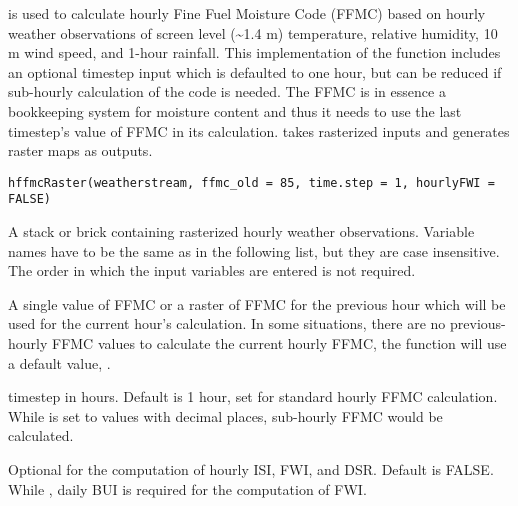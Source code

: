 \documentclass[a4paper]{book}
\begin{document}
%
\begin{Description}\relax
{} is used to calculate hourly Fine Fuel Moisture Code
(FFMC) based on hourly weather observations of screen level (\textasciitilde{}1.4 m)
temperature, relative humidity, 10 m wind speed, and 1-hour rainfall. This
implementation of the function includes an optional timestep input which is
defaulted to one hour, but can be reduced if sub-hourly calculation of the
code is needed.  The FFMC is in essence a bookkeeping system for moisture
content and thus it needs to use the last timestep's value of FFMC in its
calculation.  takes rasterized inputs and generates raster
maps as outputs.
\end{Description}
%
\begin{Usage}
\begin{verbatim}
hffmcRaster(weatherstream, ffmc_old = 85, time.step = 1, hourlyFWI = FALSE)
\end{verbatim}
\end{Usage}
%
\begin{Arguments}
\begin{ldescription}
\item[\code{weatherstream}] A stack or brick containing rasterized hourly weather
observations. Variable names have to be the same as in the following list,
but they are case insensitive. The order in which the input variables are
entered is not required.



\item[\code{ffmc\_old}] A single value of FFMC or a raster of FFMC for the previous
hour which will be used for the current hour's calculation. In some
situations, there are no previous-hourly FFMC values to calculate the
current hourly FFMC, the function will use a default value,
.

\item[\code{time.step}] timestep in hours. Default is 1 hour, set for standard
hourly FFMC calculation. While  is set to values with
decimal places, sub-hourly FFMC would be calculated.

\item[\code{hourlyFWI}] Optional for the computation of hourly ISI, FWI, and DSR.
Default is FALSE. While , daily BUI is required for the
computation of FWI.
\end{ldescription}
\end{Arguments}
\end{document}
